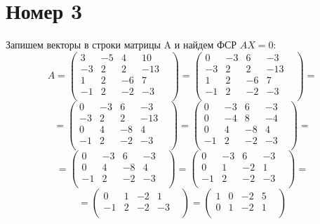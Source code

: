 \documentclass[a4paper,12pt]{article}
\begin{document}
\section*{Номер 3}
Запишем векторы в строки матрицы A и найдем ФСР $AX = 0$: 
\[
A =
\begin{pmatrix}
3 & -5 & 4 & 10 & \\
-3 & 2 & 2 & -13 & \\
1 & 2 & -6 & 7 & \\
-1 & 2 & -2 & -3 & \\
\end{pmatrix}
=
\begin{pmatrix}
0 & -3 & 6 & -3 & \\
-3 & 2 & 2 & -13 & \\
1 & 2 & -6 & 7 & \\
-1 & 2 & -2 & -3 & \\
\end{pmatrix}
=
\]
\[
=
\begin{pmatrix}
0 & -3 & 6 & -3 & \\
-3 & 2 & 2 & -13 & \\
0 & 4 & -8 & 4 & \\
-1 & 2 & -2 & -3 & \\
\end{pmatrix}
=
\begin{pmatrix}
0 & -3 & 6 & -3 & \\
0 & -4 & 8 & -4 & \\
0 & 4 & -8 & 4 & \\
-1 & 2 & -2 & -3 & \\
\end{pmatrix}
=
\]
\[
=
\begin{pmatrix}
0 & -3 & 6 & -3 & \\
0 & 4 & -8 & 4 & \\
-1 & 2 & -2 & -3 & \\
\end{pmatrix}
=
\begin{pmatrix}
0 & -3 & 6 & -3 & \\
0 & 1 & -2 & 1 & \\
-1 & 2 & -2 & -3 & \\
\end{pmatrix}
=
\]
\[
=
\begin{pmatrix}
0 & 1 & -2 & 1 & \\
-1 & 2 & -2 & -3 & \\
\end{pmatrix}
=
\begin{pmatrix}
1 & 0 & -2 & 5 & \\
0 & 1 & -2 & 1 & \\
\end{pmatrix}
\]
\end{document}
